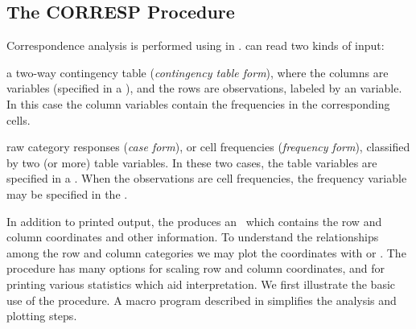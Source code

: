 
\subsection{The CORRESP Procedure}\label{sec:corresp}

Correspondence analysis is performed using  in \SSTAT.
 can read two kinds of input:

\begin{itemize*}
\item a two-way contingency table (\emph{contingency table form}),
where the columns are \Dset{}
variables (specified in a ), and the rows are observations, labeled by an
 variable.
In this case the column variables contain the frequencies in the
corresponding cells.
\item raw category responses (\emph{case form}), or cell frequencies (\emph{frequency
form}),
classified by two (or more) table variables.  In these two cases, the table variables are specified in
a .  When the observations are cell frequencies,
the frequency variable may be specified in the .
\end{itemize*}

In addition to printed output, the  produces an \ODS\
which contains the row and column
coordinates and other information.
To understand the relationships among the row and column categories
we may plot the coordinates with
 or .  The
procedure has many options for scaling row and column coordinates,
and for printing various statistics which aid interpretation.
We first illustrate the basic use of the procedure.
A macro program  described in 
simplifies the analysis and plotting steps.






